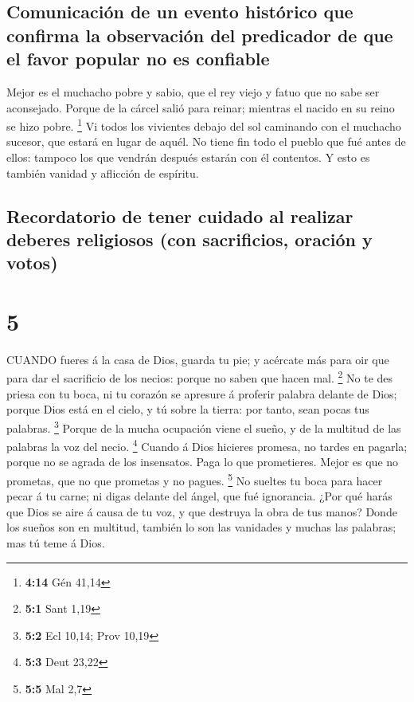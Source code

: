 \hypertarget{comunicaciuxf3n-de-un-evento-histuxf3rico-que-confirma-la-observaciuxf3n-del-predicador-de-que-el-favor-popular-no-es-confiable}{%
\subsection{Comunicación de un evento histórico que confirma la
observación del predicador de que el favor popular no es
confiable}\label{comunicaciuxf3n-de-un-evento-histuxf3rico-que-confirma-la-observaciuxf3n-del-predicador-de-que-el-favor-popular-no-es-confiable}}

 Mejor es el muchacho pobre y sabio, que el rey viejo y
fatuo que no sabe ser aconsejado.  Porque de la cárcel
salió para reinar; mientras el nacido en su reino se hizo pobre.
\footnote{\textbf{4:14} Gén 41,14}  Vi todos los vivientes
debajo del sol caminando con el muchacho sucesor, que estará en lugar de
aquél.  No tiene fin todo el pueblo que fué antes de ellos:
tampoco los que vendrán después estarán con él contentos. Y esto es
también vanidad y aflicción de espíritu.

\hypertarget{recordatorio-de-tener-cuidado-al-realizar-deberes-religiosos-con-sacrificios-oraciuxf3n-y-votos}{%
\subsection{Recordatorio de tener cuidado al realizar deberes religiosos
(con sacrificios, oración y
votos)}\label{recordatorio-de-tener-cuidado-al-realizar-deberes-religiosos-con-sacrificios-oraciuxf3n-y-votos}}

\hypertarget{section-4}{%
\section{5}\label{section-4}}

 CUANDO fueres á la casa de Dios, guarda tu pie; y acércate
más para oir que para dar el sacrificio de los necios: porque no saben
que hacen mal. \footnote{\textbf{5:1} Sant 1,19}  No te des
priesa con tu boca, ni tu corazón se apresure á proferir palabra delante
de Dios; porque Dios está en el cielo, y tú sobre la tierra: por tanto,
sean pocas tus palabras. \footnote{\textbf{5:2} Ecl 10,14; Prov 10,19}
 Porque de la mucha ocupación viene el sueño, y de la
multitud de las palabras la voz del necio. \footnote{\textbf{5:3} Deut
  23,22}  Cuando á Dios hicieres promesa, no tardes en
pagarla; porque no se agrada de los insensatos. Paga lo que prometieres.
 Mejor es que no prometas, que no que prometas y no pagues.
\footnote{\textbf{5:5} Mal 2,7}  No sueltes tu boca para
hacer pecar á tu carne; ni digas delante del ángel, que fué ignorancia.
¿Por qué harás que Dios se aire á causa de tu voz, y que destruya la
obra de tus manos?  Donde los sueños son en multitud,
también lo son las vanidades y muchas las palabras; mas tú teme á Dios.

